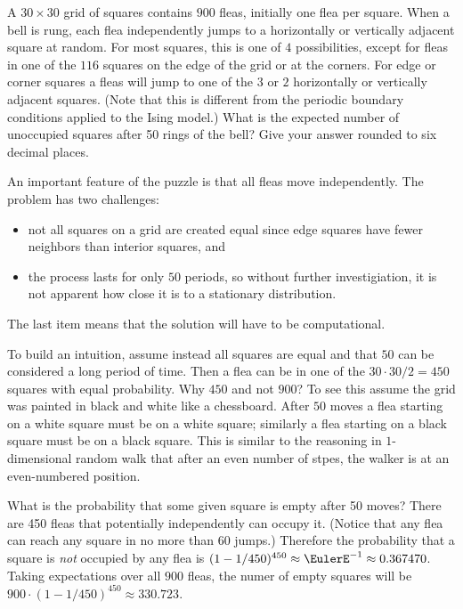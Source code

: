\documentclass[12pt]{article}
\begin{document}
\begin{exercise}
  A \( 30 \times 30 \) grid of squares contains \( 900 \) fleas, initially one flea per square.
  When a bell is rung, each flea independently jumps to a horizontally or vertically
  adjacent square at random.  For most squares, this is one of \(  4 \)
  possibilities, except for fleas in one of the \( 116 \) squares
  on the edge of the grid or at the corners.  For edge or corner squares a fleas will
  jump to one of the \( 3 \) or \( 2 \) horizontally or vertically
  adjacent squares.  (Note that this is different from the periodic
  boundary conditions applied to the Ising model.)
  What is the expected number of unoccupied squares after 50 rings of the bell?
  Give your answer rounded to six decimal places.
\end{exercise}
\begin{solution}

  An important feature of the puzzle is that all fleas move independently.
  The problem has two challenges:
  \begin{itemize}
  \item   not all squares on a grid are created equal
  since edge squares have fewer neighbors than interior squares, and
  \item the process lasts for only \( 50 \) periods, so without further
    investigiation, it is not apparent how close it is to a
    stationary distribution.
  \end{itemize}
  The last item means that the solution will have to be computational.
  
  To build an intuition, assume instead all squares are
  equal and that \( 50 \) can be considered a long period of time. Then 
  a flea can be in one of the \( 30 \cdot 30/2=450 \) squares with
  equal probability.  Why \( 450 \) and not \( 900 \)? To see this assume the
  grid was painted in black and white like a chessboard. After \( 50 \)
  moves a flea starting on a white square must be on a white square;
  similarly a flea starting on a black square must be on a black
  square.  This is similar to the reasoning in \( 1 \)-dimensional
  random walk that after an even number of stpes, the walker is at an
  even-numbered position.

  What is the probability that some given square is empty after 50
  moves?  There are 450 fleas that potentially independently can
  occupy it. (Notice that any flea can reach any square in no more than
  \( 60 \) jumps.)  Therefore the probability that a square is \emph{not}
  occupied by any flea is \( ( 1 - 1/450)^{450} \approx \EulerE^{-1}
  \approx 0.367470 \).
  Taking expectations over all \( 900 \) fleas, the numer of empty
  squares will be \( 900 \cdot ( 1 - 1/450)^{450} \approx 330.723 \).


\end{solution}
\end{document}
